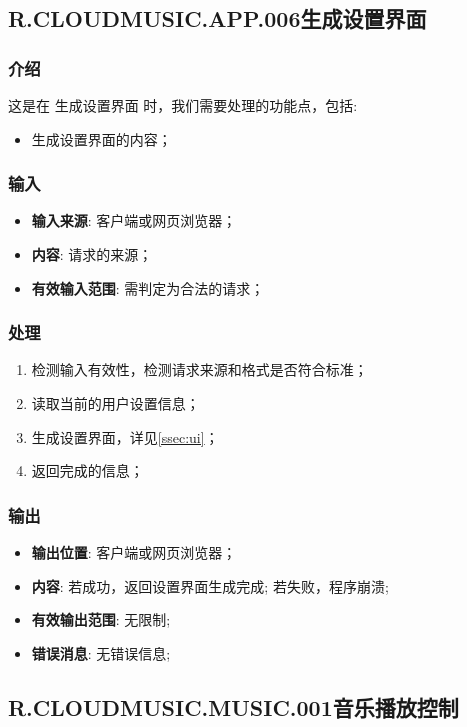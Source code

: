 \subsection{R.CLOUDMUSIC.APP.006生成设置界面}
\subsubsection{介绍}
	这是在 生成设置界面 时，我们需要处理的功能点，包括: 
	\begin{itemize}
		\item 生成设置界面的内容；
	\end{itemize}
\subsubsection{输入}
	\begin{itemize}
		\item \textbf{输入来源}: 客户端或网页浏览器；
		\item \textbf{内容}: 请求的来源；
		\item \textbf{有效输入范围}: 需判定为合法的请求；
	\end{itemize}
\subsubsection{处理}
	\begin{enumerate}
		\item 检测输入有效性，检测请求来源和格式是否符合标准；
		\item 读取当前的用户设置信息；
		\item 生成设置界面，详见\ref{ssec:ui}；
		\item 返回完成的信息；
	\end{enumerate}
\subsubsection{输出}
\begin{itemize}
	\item \textbf{输出位置}: 客户端或网页浏览器；
	\item \textbf{内容}: 若成功，返回设置界面生成完成; 若失败，程序崩溃;
	\item \textbf{有效输出范围}: 无限制;
	\item \textbf{错误消息}: 无错误信息;
\end{itemize}
\subsection{R.CLOUDMUSIC.MUSIC.001音乐播放控制}
